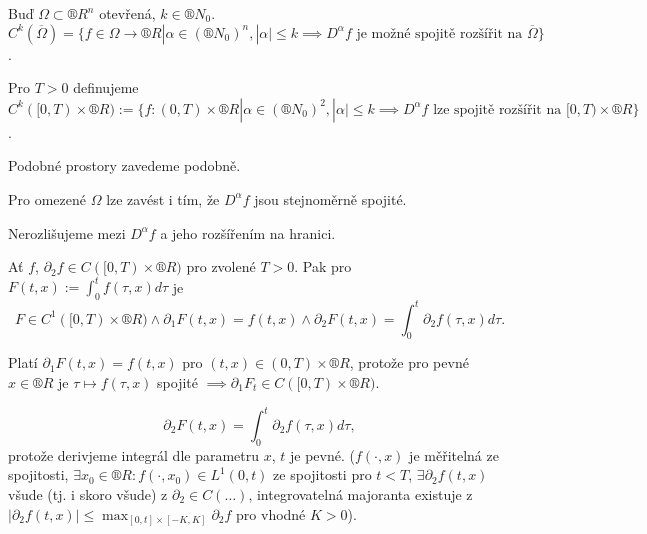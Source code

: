 \documentclass[12pt]{article}					%
\begin{document}
\begin{definice}
	Buď $\Omega \subset ®R^n$ otevřená, $k \in ®N_0$. $C^k(\overline{\Omega}) = \{f \in \Omega \rightarrow ®R | \alpha \in (®N_0)^n, |\alpha| ≤ k \implies D^\alpha f \text{ je možné spojitě rozšířit na } \overline{\Omega}\}$.

	Pro $T > 0$ definujeme $C^k([0, T) \times ®R) := \{f:(0, T) \times ®R | \alpha \in (®N_0)^2, |\alpha| ≤ k \implies D^\alpha f \text{ lze spojitě rozšířit na } [0, T)\times ®R\}$.

	\begin{poznamkain}
		Podobné prostory zavedeme podobně.

		Pro omezené $\Omega$ lze zavést i tím, že $D^\alpha f$ jsou stejnoměrně spojité.

		Nerozlišujeme mezi $D^\alpha f$ a jeho rozšířením na hranici.
	\end{poznamkain}
\end{definice}

\begin{lemma}
	Ať $f$, $\partial_2 f \in C([0, T) \times ®R)$ pro zvolené $T > 0$. Pak pro $F(t, x) := \int_0^t f(\tau, x) d\tau$ je
	$$ F \in C^1([0, T) \times ®R) \land \partial_1 F(t, x) = f(t, x) \land \partial_2 F(t, x) = \int_0^t \partial_2 f(\tau, x) d\tau. $$

	\begin{dukazin}[Náznak]
		Platí $\partial_1 F(t, x) = f(t, x)$ pro $(t, x) \in (0, T) \times ®R$, protože pro pevné $x \in ®R$ je $\tau \mapsto f(\tau, x)$ spojité $\implies \partial_1 F_t \in C([0, T) \times ®R)$.

		$$ \partial_2 F(t, x) = \int_0^t \partial_2 f(\tau, x) d\tau, $$
		protože derivjeme integrál dle parametru $x$, $t$ je pevné. ($f(·, x)$ je měřitelná ze spojitosti, $\exists x_0 \in ®R: f(·, x_0) \in L^1(0, t)$ ze spojitosti pro $t < T$, $\exists \partial_2 f(t, x)$ všude (tj. i skoro všude) z $\partial_2 \in C(…)$, integrovatelná majoranta existuje z $|\partial_2 f(t, x)| ≤ \max_{[0, t] \times [-K, K]} \partial_2 f$ pro vhodné $K > 0$).
	\end{dukazin}
\end{lemma}
\end{document}
